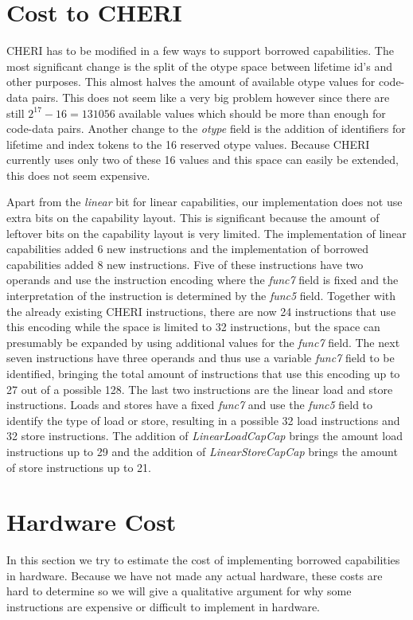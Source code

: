 \section{Cost to CHERI}
\label{sec:chericost}
CHERI has to be modified in a few ways to support borrowed capabilities.
The most significant change is the split of the otype space between lifetime id's and other purposes.
This almost halves the amount of available otype values for code-data pairs.
This does not seem like a very big problem however since there are still $2^{17} - 16 = 131056$ available values which should be more than enough for code-data pairs.
Another change to the \textit{otype} field is the addition of identifiers for lifetime and index tokens to the 16 reserved otype values.
Because CHERI currently uses only two of these 16 values and this space can easily be extended, this does not seem expensive.

Apart from the \textit{linear} bit for linear capabilities, our implementation does not use extra bits on the capability layout.
This is significant because the amount of leftover bits on the capability layout is very limited.
The implementation of linear capabilities added 6 new instructions and the implementation of borrowed capabilities added 8 new instructions.
Five of these instructions have two operands and use the instruction encoding where the \textit{func7} field is fixed and the interpretation of the instruction is determined by the \textit{func5} field.
Together with the already existing CHERI instructions, there are now 24 instructions that use this encoding while the space is limited to 32 instructions, but the space can presumably be expanded by using additional values for the \textit{func7} field.
The next seven instructions have three operands and thus use a variable \textit{func7} field to be identified, bringing the total amount of instructions that use this encoding up to 27 out of a possible 128.
The last two instructions are the linear load and store instructions.
Loads and stores have a fixed \textit{func7} and use the \textit{func5} field to identify the type of load or store, resulting in a possible 32 load instructions and 32 store instructions.
The addition of \textit{LinearLoadCapCap} brings the amount load instructions up to 29 and the addition of \textit{LinearStoreCapCap} brings the amount of store instructions up to 21.

\section{Hardware Cost}
\label{sec:hardwareeval}
In this section we try to estimate the cost of implementing borrowed capabilities in hardware.
Because we have not made any actual hardware, these costs are hard to determine so we will give a qualitative argument for why some instructions are expensive or difficult to implement in hardware.

